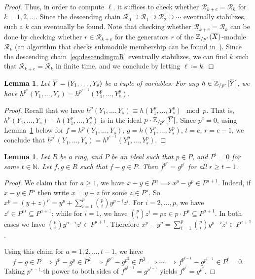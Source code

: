 \documentclass[letterpaper, 11pt, thm-restate]{article}
\numberwithin{equation}{section}
\newcommand{\N}{\mathbb{N}}
\newcommand{\Zpe}{\mathbb{Z}_{/p^e}}
\newcommand{\mR}{\mathcal{R}}
\newcommand{\oX}{\mkern 1.5mu\overline{\mkern-1.5mu X \mkern-1.5mu}\mkern 1.5mu}
\newcommand{\oY}{\mkern 1.5mu\overline{\mkern-1.5mu Y \mkern-1.5mu}\mkern 1.5mu}
\newtheorem{lem}[thrm]{Lemma}
\theoremstyle{definition}
\theoremstyle{definition}
\theoremstyle{definition}
\begin{document}
\begin{proof}
    Thus, in order to compute $\ell$, it suffices to check whether $\mR_{k+e} = \mR_k$ for $k = 1, 2, \ldots$.
    Since the descending chain $\mR_0 \supseteq \mR_1 \supseteq \mR_2 \supseteq \cdots$ eventually stabilizes, such a $k$ can eventually be found.
    Note that checking whether $\mR_{k+e} = \mR_k$ can be done by checking whether $r \in \mR_{k+e}$ for the generators $r$ of the $\Zpe(\oX)$-module $\mR_{k}$ (an algorithm that checks submodule membership can be found in~\cite{baumslag1981computable}).
    Since the descending chain~\eqref{eq:descendingmR} eventually stabilizes, we can find $k$ such that $\mR_{k+e} = \mR_k$ in finite time, and we conclude by letting $\ell \coloneqq k$.
\end{proof}

\begin{lem}\label{lem:powp}
    Let $\oY = (Y_1, \ldots, Y_s)$ be a tuple of variables.
    For any $h \in \Zpe[\oY]$, we have $h^{p^{e}}(Y_1, \ldots, Y_s) = h^{p^{e-1}}(Y_1^p, \ldots, Y_s^p)$.
\end{lem}
\begin{proof}
    Recall that we have $h^p(Y_1, \ldots, Y_s) \equiv h(Y_1^p, \ldots, Y_s^p) \mod p$.
    That is, $h^p(Y_1, \ldots, Y_s) - h(Y_1^p, \ldots, Y_s^p)$ is in the ideal $p \cdot \Zpe[\oY]$.
    Since $p^e = 0$, using Lemma~\ref{lem:lifting} below for $f = h^p(Y_1, \ldots, Y_s)$, $g = h(Y_1^p, \ldots, Y_s^p)$, $t = e$, $r = e-1$, we conclude that 
    $
    h^{p^{e}}(Y_1, \ldots, Y_s) = h^{p^{e-1}}(Y_1^p, \ldots, Y_s^p)
    $.
\end{proof}

\begin{lem}\label{lem:lifting}
    Let $R$ be a ring, and $P$ be an ideal such that $p \in P$, and $P^t = 0$ for some $t \in \N$.
    Let $f, g \in R$ such that $f - g \in P$. Then $f^{p^{r}} = g^{p^{r}}$ for all $r \geq t-1$.
\end{lem}
\begin{proof}
    We claim that for $a \geq 1$, we have $x - y \in P^a \implies x^p - y^p \in P^{a+1}$.
    Indeed, if $x - y \in P^a$ then write $x = y + z$ for some $z \in P^a$.
    So $x^p = (y + z)^p = y^p + \sum_{i = 1}^p \binom{p}{i} y^{p-i} z^i$. 
    For $i = 2, \ldots, p$, we have $z^i \in P^{ai} \subseteq P^{a+1}$; while for $i = 1$, we have $\binom{p}{i} z^i = pz \in p \cdot P^a \subseteq P^{a+1}$.
    In both cases we have $\binom{p}{i} y^{p-i} z^i \in P^{a+1}$.
    Therefore $x^p - y^p = \sum_{i = 1}^p \binom{p}{i} y^{p-i} z^i \in P^{a+1}$.

    Using this claim for $a = 1, 2, \ldots, t-1$, we have
    \[
    f - g \in P \implies f^p - g^p \in P^2 \implies f^{p^2} - g^{p^2} \in P^3 \implies \cdots \implies f^{p^{t-1}} - g^{p^{t-1}} \in P^{t} = 0.
    \]
    Taking $p^{r-t}$-th power to both sides of $f^{p^{t-1}} = g^{p^{t-1}}$ yields $f^{p^{r}} = g^{p^{r}}$.
\end{proof}
\end{document}
